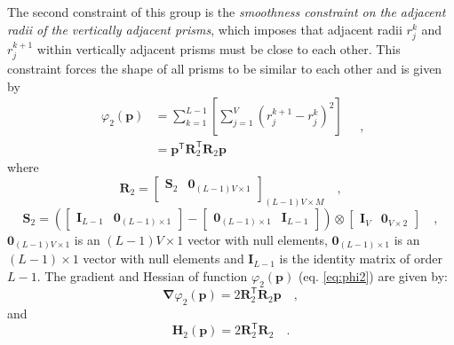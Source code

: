 The second constraint of this group is the \textit{smoothness constraint on the adjacent radii of the vertically adjacent prisms}, which imposes that adjacent radii $r_{j}^{k}$ and $r_{j}^{k+1}$ within vertically adjacent prisms must be close to each other. This constraint forces the shape of all prisms to be similar to each other
and is given by
\begin{equation}\label{eq:phi2}
\begin{split}
\varphi_{2}(\mathbf{p}) &= \sum\limits^{L-1}_{k=1}\left[\sum\limits^{V}_{j=1}\left(r^{k+1}_{j}-r^{k}_{j}\right)^2\right] \\
&= \mathbf{p}^{\mathsf{T}} \mathbf{R}^{\mathsf{T}}_{2}\mathbf{R}_{2}\mathbf{p}
\end{split} \quad ,
\end{equation}
where 
\begin{equation}
\mathbf{R}_{2} = 
\begin{bmatrix}
\mathbf{S}_{2} & \mathbf{0}_{(L-1)V \times 1} \\
\end{bmatrix}_{(L-1)V \times M} \quad ,
\label{eq:R2-matrix}
\end{equation}
\begin{equation}
\mathbf{S}_{2} =
\left( 
\begin{bmatrix} \mathbf{I}_{L-1} & \mathbf{0}_{(L-1) \times 1} \end{bmatrix} -
\begin{bmatrix} \mathbf{0}_{(L-1) \times 1} & \mathbf{I}_{L-1} \end{bmatrix} 
\right) \otimes 
\begin{bmatrix} \mathbf{I}_{V} & \mathbf{0}_{V \times 2} \end{bmatrix} \quad ,
\label{eq:S2-matrix}
\end{equation}
$\mathbf{0}_{(L-1)V \times 1}$ is an $(L-1)V \times 1$ vector with null elements,
$\mathbf{0}_{(L-1) \times 1}$ is an $(L-1) \times 1$ vector with null elements and 
$\mathbf{I}_{L-1}$ is the identity matrix of order $L-1$. The gradient and Hessian of function $\varphi_{2}(\mathbf{p})$ (eq. \ref{eq:phi2}) are given by:
\begin{equation}\label{eq:phi2_grad}
\boldsymbol{\nabla}\varphi_{2}(\mathbf{p}) = 2\mathbf{R}^\mathsf{T}_{2}\mathbf{R}_{2}\mathbf{p} \quad ,
\end{equation}
and
\begin{equation}\label{eq:phi2_hessian}
\mathbf{H}_{2}(\mathbf{p}) = 2\mathbf{R}^\mathsf{T}_{2}\mathbf{R}_{2} \quad .
\end{equation}

